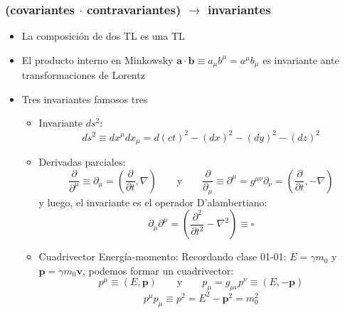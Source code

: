 \documentclass[xetex,mathserif,serif,10pt]{beamer}
\begin{document}
\begin{frame}
\frametitle{(covariantes $\cdot$ contravariantes) $\to$ invariantes}
  \begin{itemize}
    \item \alert{La composición de dos TL es una TL}
    \item \alert{El producto interno en Minkowsky $\mathbf{a}\cdot\mathbf{b}\equiv a_\mu b^\mu = a^\mu b_\mu$ es invariante ante transformaciones de Lorentz}
    \item Tres invariantes famosos tres
    \begin{itemize}
      \item \alert{Invariante $ds^2$}:
        \begin{equation}
          ds^2 \equiv dx^\mu dx_\mu = d(ct)^2 - (dx)^2 - (dy)^2 - (dz)^2
        \end{equation}
      \item \alert{Derivadas parciales}:
        \begin{equation}
          \frac{\partial}{\partial^\mu} \equiv \partial_\mu = \left( \frac{\partial}{\partial t}, \nabla \right)
          \qquad \mathrm{y} \qquad
          \frac{\partial}{\partial_\mu} \equiv \partial^\mu = g^{\mu\nu} \partial_\nu = \left(\frac{\partial}{\partial t}, -\nabla \right)
        \end{equation}
        y luego, el invariante es el operador \alert{D'alambertiano}:
        \begin{equation}
          \partial_\mu \partial^\mu = \left(\frac{\partial^2}{\partial t^2} - \nabla^2 \right) \equiv \square
        \end{equation}
      \item \alert{Cuadrivector Energía-momento}: Recordando clase 01-01: $E=\gamma m_0$ y $\mathbf{p}=\gamma m_0 \mathbf{v}$, podemos formar un cuadrivector:
        \begin{equation}
          p^\mu \equiv (E,\mathbf{p}) \qquad \mathrm{y} \qquad  p_\mu = g_{\mu\nu} p^\nu \equiv (E,-\mathbf{p})
        \end{equation}
        \begin{equation}
          p^\mu p_\mu \equiv p^2 = E^2 -\mathbf{p}^2 = m_0^2
        \end{equation}
    \end{itemize}
  \end{itemize}
\end{frame}
\end{document}
